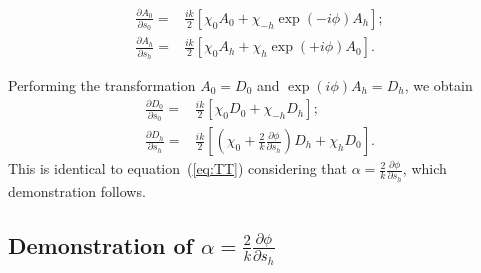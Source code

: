 \documentclass{iucr}
\begin{document}
\begin{subequations}
\begin{align}
\frac{\partial A_0}{\partial s_0} =& \frac{ik}{2} \left[ \chi_0 A_0+ \chi_{-h} \exp(-i\phi) A_h\right]; \nonumber \\
\frac{\partial A_h}{\partial s_h} =& \frac{ik}{2} \left[ \chi_0 A_h+ \chi_{h} \exp(+i\phi) A_0 \right]. \nonumber
\end{align}
\end{subequations}

Performing the transformation $A_0=D_0$ and $\exp(i\phi) A_h=D_h$, we obtain
\begin{subequations}
\begin{align}
\frac{\partial D_0}{\partial s_0} =& \frac{ik}{2} \left[ \chi_0 D_0+ \chi_{-h} D_h\right]; \\
\frac{\partial D_h}{\partial s_h} =& \frac{ik}{2} \left[ (\chi_0 + \frac{2}{k}\frac{\partial\phi}{\partial s_h} ) D_h+ \chi_{h} D_0\right].
\end{align}
\end{subequations}
This is identical to equation~(\ref{eq:TT}) considering that $\alpha=\frac{2}{k}\frac{\partial\phi}{\partial s_h}$, which demonstration follows.

\subsection{Demonstration of $\alpha=\frac{2}{k}\frac{\partial\phi}{\partial s_h}$ }
\end{document}
